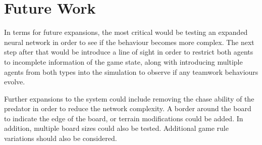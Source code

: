 
\section{Future Work}
In terms for future expansions, the most critical would be testing an expanded neural network in order to see if the behaviour becomes more complex. The next step after that would be introduce a line of sight in order to restrict both agents to incomplete information of the game state, along with introducing multiple agents from both types into the simulation to observe if any teamwork behaviours evolve.

Further expansions to the system could include removing the chase ability of the predator in order to reduce the network complexity. A border around the board to indicate the edge of the board, or terrain modifications could be added. In addition, multiple board sizes could also be tested. Additional game rule variations should also be considered.